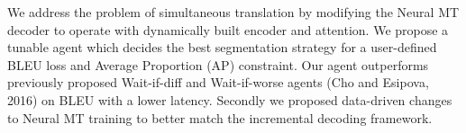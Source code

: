 We address the problem of simultaneous translation by modifying the Neural MT decoder to operate with dynamically built encoder and attention. We propose a tunable agent which decides the best segmentation strategy for a user-defined BLEU loss and Average Proportion (AP) constraint. Our agent outperforms previously proposed Wait-if-diff and Wait-if-worse agents (Cho and Esipova, 2016) on BLEU with a lower latency. Secondly we proposed data-driven changes to Neural MT training to better match the incremental decoding framework.
